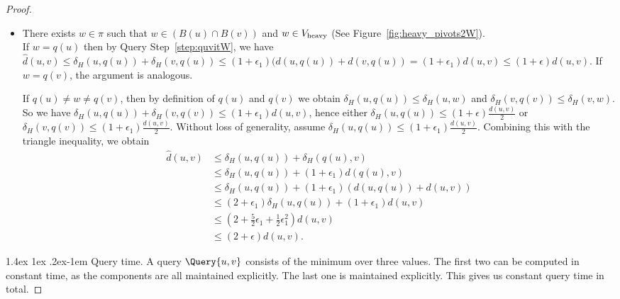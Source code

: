 \documentclass[11pt]{article}
\makeatletter
\theoremstyle{definition}
\theoremstyle{remark}
\renewcommand{\paragraph}{%
  \@startsection{paragraph}{4}%
  {\z@}{1.4ex \@plus 1ex \@minus .2ex}{-1em}%
  {\normalfont\normalsize\bfseries}%
}
\makeatother
\begin{document}
\begin{titlepage}
\begin{proof}
\begin{itemize}
\begin{align*}
                &\leq (1+\epsilon_4)(1+\epsilon_2)(d(u,w)+d(v,w))\\
                &= (1+\epsilon_2+\epsilon_2\epsilon_4+\epsilon_4)d(u,v)\\
                &\leq (1+\epsilon)d(u,v).
            \end{align*}
            \item[Case 4:] 
            There exists $w\in \pi$ such that $w\in (B(u)\cap B(v))$ and $w\in V_{\rm{heavy}}$ (See Figure~\ref{fig:heavy_pivots2W}).\\
            If $w=q(u)$ then by Query Step~\ref{step:quvitW}, we have $\hat d(u,v)\leq \delta_H(u,q(u))+\delta_H(v,q(u))\leq (1+\epsilon_1)(d(u,q(u))+d(v,q(u))=(1+\epsilon_1)d(u,v)\leq (1+\epsilon)d(u,v)$. If $w=q(v)$, the argument is analogous. 
            
            If $q(u)\neq w \neq q(v)$, then by definition of $q(u)$ and $q(v)$ we obtain $\delta_H(u,q(u))\leq \delta_H(u,w)$ and $\delta_H(v,q(v))\leq \delta_H(v,w)$. So we have $\delta_H(u,q(u))+\delta_H(v,q(v))\leq (1+\epsilon_1)d(u,v)$, hence either $\delta_H(u,q(u))\leq (1+\epsilon)\tfrac{d(u,v)}{2}$ or $\delta_H(v,q(v))\leq (1+\epsilon_1)\tfrac{d(u,v)}{2}$. Without loss of generality, assume $\delta_H(u,q(u))\leq (1+\epsilon_1) \tfrac{d(u,v)}{2}$. Combining this with the triangle inequality, we obtain
            \begin{align*}
                \hat d(u,v) &\leq \delta_H(u,q(u))+\delta_H(q(u),v)\\
                &\leq \delta_H(u,q(u))+(1+\epsilon_1)d(q(u),v)\\
                &\leq \delta_H(u,q(u))+(1+\epsilon_1)(d(u,q(u))+d(u,v))\\
                &\leq (2+\epsilon_1)\delta_H(u,q(u))+(1+\epsilon_1)d(u,v)\\
                &\leq (2+\tfrac{5}{2}\epsilon_1+\tfrac{1}{2}\epsilon_1^2)d(u,v)\\
                &\leq (2+\epsilon)d(u,v).
            \end{align*}  
    \end{itemize}
            
            
    \paragraph{Query time.}
    A query $\Query{u,v}$ consists of the minimum over three values. The first two can be computed in constant time, as the components are all maintained explicitly. The last one is maintained explicitly. This gives us constant query time in total.
\end{proof}


\end{titlepage}
\end{document}
